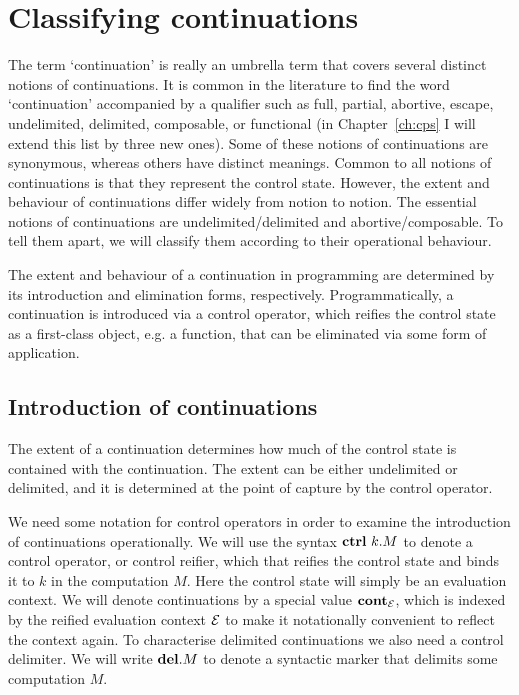 \documentclass[12pt,phd,lfcs,twoside,openright,logo,leftchapter,normalheadings]{infthesis}
\theoremstyle{plain}
\theoremstyle{definition}
\begin{document}
\section{Classifying continuations}
\label{sec:classifying-continuations}

The term `continuation' is really an umbrella term that covers several
distinct notions of continuations. It is common in the literature to
find the word `continuation' accompanied by a qualifier such as full,
partial, abortive, escape, undelimited, delimited, composable, or
functional (in Chapter~\ref{ch:cps} I will extend this list by three
new ones). Some of these notions of continuations are synonymous,
whereas others have distinct meanings. Common to all notions of
continuations is that they represent the control state. However, the
extent and behaviour of continuations differ widely from notion to
notion. The essential notions of continuations are
undelimited/delimited and abortive/composable. To tell them apart, we
will classify them according to their operational behaviour.

The extent and behaviour of a continuation in programming are
determined by its introduction and elimination forms,
respectively. Programmatically, a continuation is introduced via a
control operator, which reifies the control state as a first-class
object, e.g. a function, that can be eliminated via some form of
application.

\subsection{Introduction of continuations}
%
The extent of a continuation determines how much of the control state
is contained with the continuation.
%
The extent can be either undelimited or delimited, and it is
determined at the point of capture by the control operator.
%

We need some notation for control operators in order to examine the
introduction of continuations operationally. We will use the syntax
$\mathbf{ctrl}~k.M$ to denote a control operator, or control reifier, which that
reifies the control state and binds it to $k$ in the computation
$M$. Here the control state will simply be an evaluation context. We
will denote continuations by a special value $\mathbf{cont}_{\mathcal{E}}$, which is
indexed by the reified evaluation context $\mathcal{E}$ to make it
notationally convenient to reflect the context again. To characterise
delimited continuations we also need a control delimiter. We will
write $\mathbf{del}.M$ to denote a syntactic marker that delimits some
computation $M$.
\end{document}
